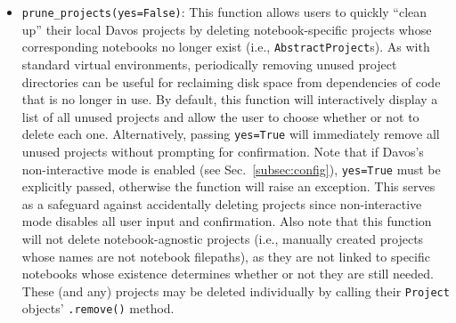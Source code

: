 \documentclass[preprint,12pt,a4paper]{elsarticle}
\begin{document}
\begin{itemize}
\item \texttt{prune\_projects(yes=False)}: This function allows users to quickly ``clean up'' their local Davos projects by deleting notebook-specific projects whose corresponding notebooks no longer exist (i.e., \texttt{AbstractProject}s).
  As with standard virtual environments, periodically removing unused project directories can be useful for reclaiming disk space from dependencies of code that is no longer in use.
  By default, this function will interactively display a list of all unused projects and allow the user to choose whether or not to delete each one.
  Alternatively, passing \texttt{yes=True} will immediately remove all unused projects without prompting for confirmation.
  Note that if Davos's non-interactive mode is enabled (see Sec.~\ref{subsec:config}), \texttt{yes=True} must be explicitly passed, otherwise the function will raise an exception.
  This serves as a safeguard against accidentally deleting projects since non-interactive mode disables all user input and confirmation.
  Also note that this function will not delete notebook-agnostic projects (i.e., manually created projects whose names are not notebook filepaths), as they are not linked to specific notebooks whose existence determines whether or not they are still needed.
  These (and any) projects may be deleted individually by calling their \texttt{Project} objects' \texttt{.remove()} method.


\end{itemize}
\end{document}
